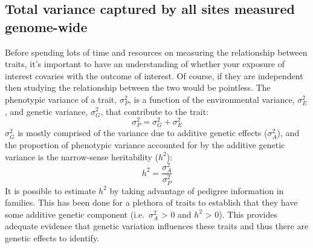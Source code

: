 \documentclass[11pt,twoside]{bristolthesis}
\begin{document}
\hypertarget{heritability}{%
\subsection{Total variance captured by all sites measured genome-wide}\label{heritability}}

Before spending lots of time and resources on measuring the relationship between traits, it's important to have an understanding of whether your exposure of interest covaries with the outcome of interest. Of course, if they are independent then studying the relationship between the two would be pointless. The phenotypic variance of a trait, \(\sigma^2_{P}\), is a function of the environmental variance, \(\sigma^2_{E}\), and genetic variance, \(\sigma^2_{G}\), that contribute to the trait:
\begin{equation}
    \sigma^2_{P} = \sigma^2_{G} + \sigma^2_{E}
    \label{eq:phenotypic-variance}
\end{equation}
\(\sigma^2_{G}\) is mostly comprised of the variance due to additive genetic effects (\(\sigma^2_{A}\)), and the proportion of phenotypic variance accounted for by the additive genetic variance is the narrow-sense heritability (\(h^2\)):
\begin{equation}
    h^2 = \frac{\sigma^2_{A}} {\sigma^2_{P}}
    \label{eq:narrow-sense-heritability}
\end{equation}
It is possible to estimate \(h^2\) by taking advantage of pedigree information in families. This has been done for a plethora of traits to establish that they have some additive genetic component (i.e.~\(\sigma^2_{A}\) \textgreater{} 0 and \(h^2\) \textgreater{} 0). This provides adequate evidence that genetic variation influences these traits and thus there are genetic effects to identify.
\end{document}
